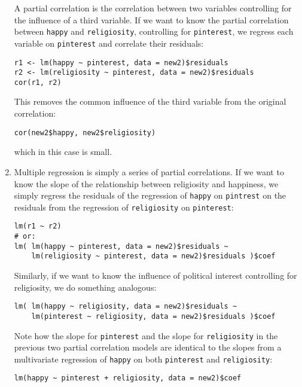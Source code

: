 \documentclass[a4paper,12pt]{article}
\begin{document}
\begin{enumerate}
A partial correlation is the correlation between two variables controlling for the influence of a third variable. If we want to know the partial correlation between \texttt{happy} and \texttt{religiosity}, controlling for \texttt{pinterest}, we regress each variable on \texttt{pinterest} and correlate their residuals:

\begin{verbatim}
r1 <- lm(happy ~ pinterest, data = new2)$residuals
r2 <- lm(religiosity ~ pinterest, data = new2)$residuals
cor(r1, r2)
\end{verbatim}

\noindent This removes the common influence of the third variable from the original correlation:

\begin{verbatim}
cor(new2$happy, new2$religiosity)
\end{verbatim}

\noindent which in this case is small.

\item Multiple regression is simply a series of partial correlations. If we want to know the slope of the relationship between religiosity and happiness, we simply regress the residuals of the regression of \texttt{happy} on \texttt{pintrest} on the residuals from the regression of \texttt{religiosity} on \texttt{pinterest}:

\begin{verbatim}
lm(r1 ~ r2)
# or:
lm( lm(happy ~ pinterest, data = new2)$residuals ~
    lm(religiosity ~ pinterest, data = new2)$residuals )$coef
\end{verbatim}

\noindent Similarly, if we want to know the influence of political interest controlling for religiosity, we do something analogous:

\begin{verbatim}
lm( lm(happy ~ religiosity, data = new2)$residuals ~
    lm(pinterest ~ religiosity, data = new2)$residuals )$coef
\end{verbatim}

\noindent Note how the slope for \texttt{pinterest} and the slope for \texttt{religiosity} in the previous two partial correlation models are identical to the slopes from a multivariate regression of \texttt{happy} on both \texttt{pinterest} and \texttt{religiosity}:

\begin{verbatim}
lm(happy ~ pinterest + religiosity, data = new2)$coef
\end{verbatim}


\end{enumerate}
\end{document}
